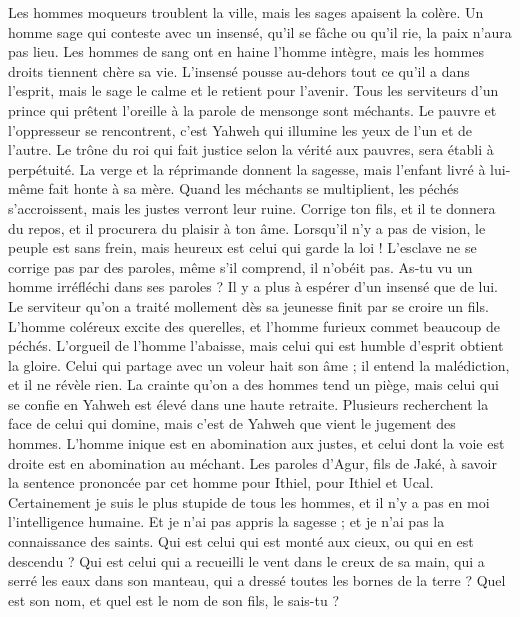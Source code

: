 \begin{multicols}{2}
Les hommes moqueurs troublent la ville, mais les sages apaisent la colère.
Un homme sage qui conteste avec un insensé, qu'il se fâche ou qu'il rie, la paix n'aura pas lieu.
Les hommes de sang ont en haine l'homme intègre, mais les hommes droits tiennent chère sa vie.
L’insensé pousse au-dehors tout ce qu’il a dans l’esprit, mais le sage le calme et le retient pour l’avenir.
Tous les serviteurs d'un prince qui prêtent l'oreille à la parole de mensonge sont méchants.
Le pauvre et l'oppresseur se rencontrent, c’est Yahweh qui illumine les yeux de l’un et de l’autre.
Le trône du roi qui fait justice selon la vérité aux pauvres, sera établi à perpétuité.
La verge et la réprimande donnent la sagesse, mais l'enfant livré à lui-même fait honte à sa mère.
Quand les méchants se multiplient, les péchés s’accroissent, mais les justes verront leur ruine.
Corrige ton fils, et il te donnera du repos, et il procurera du plaisir à ton âme.
Lorsqu'il n'y a pas de vision, le peuple est sans frein, mais heureux est celui qui garde la loi !
L’esclave ne se corrige pas par des paroles, même s’il comprend, il n’obéit pas.
As-tu vu un homme irréfléchi dans ses paroles ? Il y a plus à espérer d’un insensé que de lui.
Le serviteur qu’on a traité mollement dès sa jeunesse finit par se croire un fils.
L'homme coléreux excite des querelles, et l'homme furieux commet beaucoup de péchés.
L'orgueil de l'homme l'abaisse, mais celui qui est humble d'esprit obtient la gloire.
Celui qui partage avec un voleur hait son âme ; il entend la malédiction, et il ne révèle rien.
La crainte qu’on a des hommes tend un piège, mais celui qui se confie en Yahweh est élevé dans une haute retraite.
Plusieurs recherchent la face de celui qui domine, mais c'est de Yahweh que vient le jugement des hommes.
L'homme inique est en abomination aux justes, et celui dont la voie est droite est en abomination au méchant.
\VerseOne{}Les paroles d'Agur, fils de Jaké, à savoir la sentence prononcée par cet homme pour Ithiel, pour Ithiel et Ucal.
Certainement je suis le plus stupide de tous les hommes, et il n'y a pas en moi l’intelligence humaine.
Et je n'ai pas appris la sagesse ; et je n’ai pas la connaissance des saints.
Qui est celui qui est monté aux cieux, ou qui en est descendu ? Qui est celui qui a recueilli le vent dans le creux de sa main, qui a serré les eaux dans son manteau, qui a dressé toutes les bornes de la terre ? Quel est son nom, et quel est le nom de son fils, le sais-tu ?

\end{multicols}
